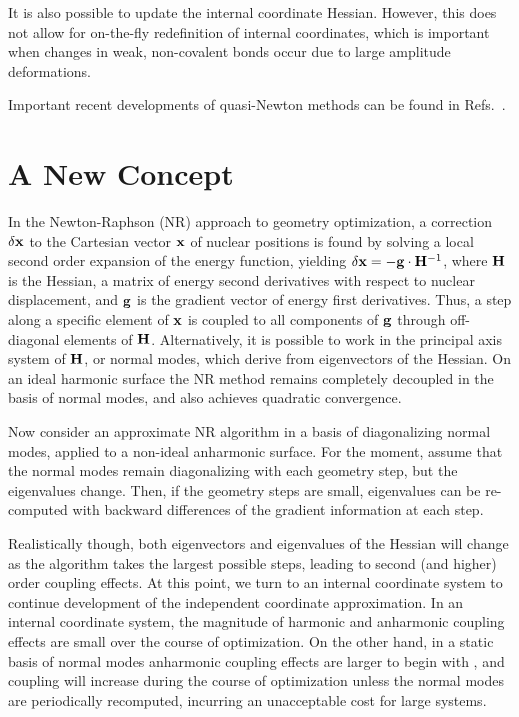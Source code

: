\documentclass[prl,aps,preprint,superbib,12pt]{revtex4}
\begin{document}
It is also possible to update the internal coordinate Hessian. However, this does not allow for 
on-the-fly redefinition of internal coordinates, which is important when  changes in weak, non-covalent 
bonds occur due to large amplitude deformations.

Important recent developments of quasi-Newton methods can be found in
Refs.~.

\section{A New Concept} \label{concept}

In the Newton-Raphson (NR) approach to geometry optimization, a correction $\delta {\bf x}$  to the 
Cartesian vector $\bf x$ of nuclear positions is found by solving a local second order expansion of the 
energy function, yielding  $\delta {\bf x}  = - {\bf g}\cdot {\bf H}^{-1}$,  where $\bf H$ 
is the Hessian, a matrix of energy second derivatives with respect to nuclear displacement,
and $\bf g$ is the gradient vector of energy first derivatives.  Thus, 
a step along a specific element of $\bf x$ is coupled to all components of $\bf g$ through off-diagonal 
elements of $\bf H$.  Alternatively, it is possible to work in the principal axis system of $\bf H$, or 
normal modes,  which derive from eigenvectors of the Hessian.  On an ideal harmonic surface the NR method remains 
completely decoupled 
in the basis of normal modes, and also achieves quadratic convergence.  

Now consider an approximate NR algorithm in a basis of diagonalizing normal modes,  applied to a 
non-ideal anharmonic surface.  For the moment,  assume that the normal modes remain diagonalizing with each
geometry step, but the eigenvalues change.  Then, if the geometry steps are small,
eigenvalues can be re-computed with backward differences of the gradient information at each step. 

Realistically though, both eigenvectors and eigenvalues of the Hessian will change as the 
algorithm takes the largest possible steps, leading to second (and higher) order coupling effects.  At this point, 
we turn to an internal coordinate system to continue development of the independent coordinate 
approximation.  In an internal coordinate system, the magnitude of harmonic and anharmonic coupling
effects are small over the course of optimization.  On the other hand,
in a static basis of normal modes anharmonic coupling effects are larger to begin with \cite{GFogarasi79}, 
and coupling will increase during the course of optimization unless the normal modes are 
periodically recomputed, incurring an unacceptable cost for large systems.  
\end{document}
